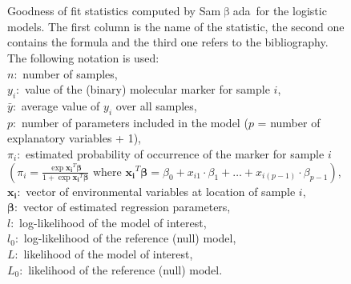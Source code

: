 \documentclass[a4paper,11pt]{article}
\newcommand{\smb}{\textsf{Sam$\upbeta$ada}}
\begin{document}
\begin{figure}[htbp]
\scriptsize
{}\\
\\
\caption[Goodness of fit statistics computed by \smb\ for the logistic models.]
{Goodness of fit statistics computed by \smb\ for the logistic models. 
The first column is the name of the statistic, the second one contains the formula and the third one refers to the bibliography. 
The following notation is used: \\
$n$:~number of samples, \\
$y_i$:~value of the (binary) molecular marker for sample $i$, \\
$\bar{y}$:~average value of $y_i$ over all samples, \\
$p$:~number of parameters included in the model ($p$ = number of explanatory variables + 1), \\
$\pi_i$:~estimated probability of occurrence of the marker for sample $i$ \( \left( \pi_i = \frac{ \exp{\bm{x_i}^T \bm{\beta} }}{1 + \exp{\bm{x_i}^T \bm{\beta} }} \mbox{ where } \bm{x_i}^T \bm{\beta} = \beta_0 + x_{i1} \cdot \beta_1 + \dots + x_{i(p-1)} \cdot \beta_{p-1} \right) \), \\
$\bm{x_i}$:~vector of environmental variables at location of sample $i$, \\
$\bm{\beta}$:~vector of estimated regression parameters, \\
$l$:~log-likelihood of the model of interest, \\
$l_0$:~log-likelihood of the reference (null) model, \\
$L$:~likelihood of the model of interest, \\
$L_0$:~likelihood of the reference (null) model.
}
\label{fig:underlying-models}
\end{figure}
\end{document}
